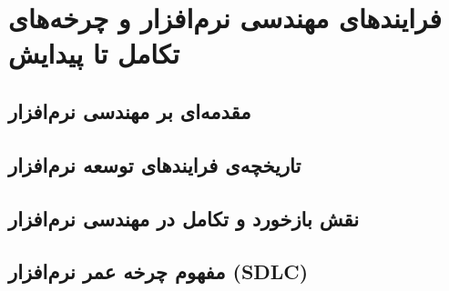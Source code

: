 \chapter{فرایندهای مهندسی نرم‌افزار و چرخه‌های تکامل تا پیدایش}
\label{ch:introduction}

\section{مقدمه‌ای بر مهندسی نرم‌افزار}
\label{sec:ch1-sec1}


\section{تاریخچه‌ی فرایندهای توسعه نرم‌افزار}
\label{sec:ch1-sec2}


\section{نقش بازخورد و تکامل در مهندسی نرم‌افزار}
\label{sec:ch1-sec3}


\section{مفهوم چرخه عمر نرم‌افزار (SDLC)}
\label{sec:ch1-sec4}


